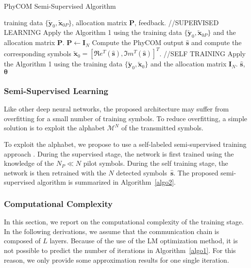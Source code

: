 \documentclass{article}
\begin{document}
   \begin{algorithm}[!t]
 \caption{PhyCOM Semi-Supervised Algorithm}
 \begin{algorithmic}[1]
 \renewcommand{\algorithmicrequire}{\textbf{Input:}}
 \renewcommand{\algorithmicensure}{\textbf{Output:}}
 \REQUIRE training data $\{\tilde{\mathbf{y}}_0,\tilde{\mathbf{x}}_{0P}\}$, allocation matrix $\mathbf{P}$, feedback. 
   \STATE  //SUPERVISED LEARNING
\STATE Apply the Algorithm 1 using the training data $\{\tilde{\mathbf{y}}_0,\tilde{\mathbf{x}}_{0P}\}$ and the allocation matrix $\mathbf{P}$.
 \STATE $\mathbf{P}\leftarrow \mathbf{I}_N$
\STATE Compute the PhyCOM output $\widehat{\mathbf{s}}$ and compute the corresponding symbols $\tilde{\mathbf{x}}_{0}=[\Re e^T(\widehat{\mathbf{s}}),\Im m^T(\widehat{\mathbf{s}})]^T$.
  \STATE  //SELF TRAINING 
\STATE Apply the Algorithm 1 using the training data $\{\tilde{\mathbf{y}}_0,\tilde{\mathbf{x}}_{0}\}$ and the allocation matrix $\mathbf{I}_N$.
 \ENDIF
 \RETURN $\widehat{\mathbf{s}}$, $\boldsymbol \theta$
 \end{algorithmic}\label{algo2}
 \end{algorithm}



\subsubsection{Semi-Supervised Learning}
\label{sub_sec_imp}

Like other deep neural networks, the proposed architecture may suffer from overfitting for a small number of training symbols. To reduce overfitting, a simple solution is to exploit the alphabet $\mathcal{M}^N$ of the transmitted symbols.

To exploit the alphabet, we propose to use a self-labeled semi-supervised training approach \cite{TRI15}. During the supervised stage, the network is first trained using the knowledge of the $N_P\ll N$ pilot symbols. During the self training stage, the network is then retrained with the $N$ detected symbols~$\widehat{\mathbf{s}}$. The proposed semi-supervised algorithm is summarized in Algorithm~\ref{algo2}. 




\subsubsection{Computational Complexity}

In this section, we report on the computational complexity of the training stage. In the following derivations, we assume that the communication chain is composed of $L$ layers. Because of the use of the LM optimization method, it is not possible to predict the number of iterations in Algorithm~\ref{algo1}. For this reason, we only provide some approximation results for one single iteration. 
\end{document}
